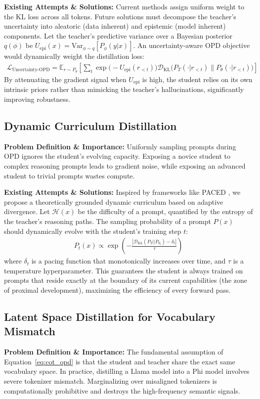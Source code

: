 \documentclass{article} %
\begin{document}
\textbf{Existing Attempts \& Solutions:} Current methods assign uniform weight to the KL loss across all tokens. Future solutions must decompose the teacher's uncertainty into aleatoric (data inherent) and epistemic (model inherent) components. Let the teacher's predictive variance over a Bayesian posterior $q(\phi)$ be $U_{\text{epi}}(x) = \text{Var}_{\phi \sim q}[P_\phi(y|x)]$. An uncertainty-aware OPD objective would dynamically weight the distillation loss:
\begin{align}
\mathcal{L}_{\text{Uncertainty-OPD}} = \mathbb{E}_{r \sim P_\theta} \left[ \sum_t \exp\big(-U_{\text{epi}}(r_{<t})\big) \mathcal{D}_{\text{KL}}\Big(P_T(\cdot | r_{<t}) \parallel P_\theta(\cdot | r_{<t})\Big) \right]
\end{align}
By attenuating the gradient signal when $U_{\text{epi}}$ is high, the student relies on its own intrinsic priors rather than mimicking the teacher's hallucinations, significantly improving robustness.

\subsection{Dynamic Curriculum Distillation}
\textbf{Problem Definition \& Importance:} Uniformly sampling prompts during OPD ignores the student's evolving capacity. Exposing a novice student to complex reasoning prompts leads to gradient noise, while exposing an advanced student to trivial prompts wastes compute. 

\textbf{Existing Attempts \& Solutions:} Inspired by frameworks like PACED \citep{2603.11178}, we propose a theoretically grounded dynamic curriculum based on adaptive divergence. Let $\mathcal{H}(x)$ be the difficulty of a prompt, quantified by the entropy of the teacher's reasoning paths. The sampling probability of a prompt $P(x)$ should dynamically evolve with the student's training step $t$:
\begin{align}
P_t(x) \propto \exp\left( -\frac{| \mathcal{D}_{\text{KL}}(P_T || P_{\theta_t}) - \delta_t |}{\tau} \right)
\end{align}
where $\delta_t$ is a pacing function that monotonically increases over time, and $\tau$ is a temperature hyperparameter. This guarantees the student is always trained on prompts that reside exactly at the boundary of its current capabilities (the zone of proximal development), maximizing the efficiency of every forward pass.

\subsection{Latent Space Distillation for Vocabulary Mismatch}
\textbf{Problem Definition \& Importance:} The fundamental assumption of Equation~\ref{eq:cot_opd} is that the student and teacher share the exact same vocabulary space. In practice, distilling a Llama model into a Phi model involves severe tokenizer mismatch. Marginalizing over misaligned tokenizers is computationally prohibitive and destroys the high-frequency semantic signals.
\end{document}
